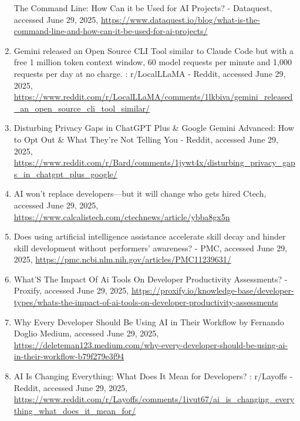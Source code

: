 \documentclass[a4paper,12pt]{article}
\begin{document}
\begin{multicols}{2}
\begin{enumerate}
      The Command Line: How Can it be Used for AI Projects? - Dataquest,
      accessed June 29, 2025,
      \url{https://www.dataquest.io/blog/what-is-the-command-line-and-how-can-it-be-used-for-ai-projects/}\\
    \item
      Gemini released an Open Source CLI Tool similar to Claude Code but
      with a free 1 million token context window, 60 model requests per
      minute and 1,000 requests per day at no charge. : r/LocalLLaMA -
      Reddit, accessed June 29, 2025,
      \url{https://www.reddit.com/r/LocalLLaMA/comments/1lkbiva/gemini_released_an_open_source_cli_tool_similar/}\\
    \item
      Disturbing Privacy Gaps in ChatGPT Plus \& Google Gemini Advanced:
      How to Opt Out \& What They're Not Telling You - Reddit, accessed
      June 29, 2025,
      \url{https://www.reddit.com/r/Bard/comments/1jywt4x/disturbing_privacy_gaps_in_chatgpt_plus_google/}\\
    \item
      AI won't replace developers---but it will change who gets hired
      \textbar{} Ctech, accessed June 29, 2025,
      \url{https://www.calcalistech.com/ctechnews/article/ybba8gx5n}\\
    \item
      Does using artificial intelligence assistance accelerate skill
      decay and hinder skill development without performers' awareness?
      - PMC, accessed June 29, 2025,
      \url{https://pmc.ncbi.nlm.nih.gov/articles/PMC11239631/}\\
    \item
      What'S The Impact Of Ai Tools On Developer Productivity
      Assessments? - Proxify, accessed June 29, 2025,
      \url{https://proxify.io/knowledge-base/developer-types/whats-the-impact-of-ai-tools-on-developer-productivity-assessments}\\
    \item
      Why Every Developer Should Be Using AI in Their Workflow
      \textbar{} by Fernando Doglio \textbar{} Medium, accessed June 29,
      2025,
      \url{https://deleteman123.medium.com/why-every-developer-should-be-using-ai-in-their-workflow-b79f279e3f94}\\
    \item
      AI Is Changing Everything: What Does It Mean for Developers? :
      r/Layoffs - Reddit, accessed June 29, 2025,
      \url{https://www.reddit.com/r/Layoffs/comments/1ivut67/ai_is_changing_everything_what_does_it_mean_for/}\\

\end{enumerate}
\end{multicols}
\end{document}
